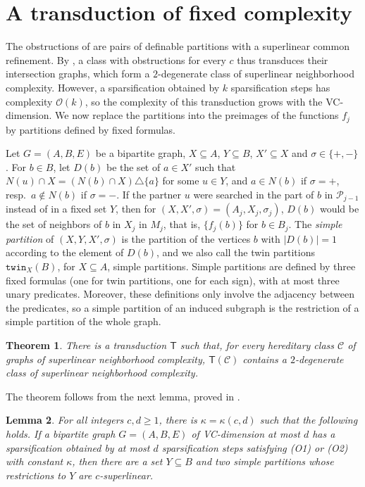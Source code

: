 \documentclass[11pt]{article}
\newtheorem{theorem}{Theorem}
\newtheorem{lemma}[theorem]{Lemma}
\theoremstyle{definition}
\newcommand{\CC}{{\mathscr C}}
\newcommand{\Oh}{\mathcal{O}}
\renewcommand{\ge}{\geqslant}
\newcommand{\set}[1]{\{#1\}}
\newcommand{\Pp}{\mathcal{P}}
\newcommand{\remph}[1]{{\color{red} \emph{#1}}}
\newcommand{\twin}{\mathtt{twin}}
\begin{document}
\section{A transduction of fixed complexity}
\label{sec:fixed}

The obstructions of  are pairs of definable partitions with a superlinear common refinement.
By , a class with obstructions for every $c$ thus transduces their intersection graphs, which form a $2$-degenerate class of superlinear neighborhood complexity.
However, a sparsification obtained by $k$ sparsification steps has complexity $\Oh(k)$, so the complexity of this transduction grows with the VC-dimension.
We now replace the partitions into the preimages of the functions $f_j$ by partitions defined by fixed formulas.

Let $G = (A, B, E)$ be a bipartite graph, $X \subseteq A$, $Y \subseteq B$, $X' \subseteq X$ and $\sigma \in \set{+,-}$.
For $b \in B$, let $D(b)$ be the set of $a \in X'$ such that $N(u) \cap X = (N(b) \cap X) \triangle \set{a}$ for some $u \in Y$, and $a \in N(b)$ if $\sigma = +$, resp.\ $a \notin N(b)$ if $\sigma = -$.
If the partner $u$ were searched in the part of $b$ in $\Pp_{j-1}$ instead of in a fixed set $Y$, then for $(X, X', \sigma) = (A_j, X_j, \sigma_j)$, $D(b)$ would be the set of neighbors of $b$ in $X_j$ in $M_j$, that is, $\set{f_j(b)}$ for $b \in B_j$.
The \remph{simple partition} of $(X, Y, X', \sigma)$ is the partition of the vertices $b$ with $|D(b)| = 1$ according to the element of $D(b)$, and we also call the twin partitions $\twin_X(B)$, for $X \subseteq A$, simple partitions.
Simple partitions are defined by three fixed formulas (one for twin partitions, one for each sign), with at most three unary predicates.
Moreover, these definitions only involve the adjacency between the predicates, so a simple partition of an induced subgraph is the restriction of a simple partition of the whole graph.

\begin{theorem}\label{thm:fixed}
There is a transduction $\mathsf T$ such that, for every hereditary class $\CC$ of graphs of superlinear neighborhood complexity, $\mathsf T(\CC)$ contains a $2$-degenerate class of superlinear neighborhood complexity.
\end{theorem}

The theorem follows from the next lemma, proved in .

\begin{lemma}\label{lem:simple}
For all integers $c, d \ge 1$, there is $\kappa = \kappa(c, d)$ such that the following holds.
If a bipartite graph $G = (A, B, E)$ of VC-dimension at most $d$ has a sparsification obtained by at most $d$ sparsification steps satisfying (O1) or (O2) with constant $\kappa$, then there are a set $Y \subseteq B$ and two simple partitions whose restrictions to $Y$ are $c$-superlinear.
\end{lemma}
\end{document}
